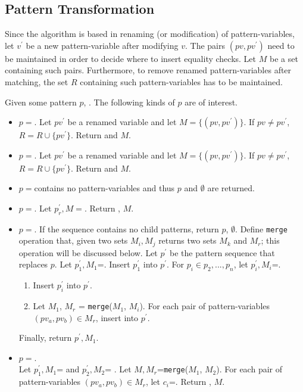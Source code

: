 \subsection{Pattern Transformation}
Since the algorithm is based in renaming (or modification) of pattern-variables, let $v^{\prime}$ be a new pattern-variable after modifying $v$. The pairs $(pv, pv^{\prime})$ need to be maintained in order to decide where to insert equality checks. Let $M$ be a set containing such pairs. Furthermore, to remove renamed pattern-variables after matching, the set $R$ containing such pattern-variables has to be maintained.

Given some pattern $p$, . The following kinds of $p$ are of interest.
\begin{itemize}
\item $p=$\space \BuiltInPattern. Let $pv^{\prime}$ be a renamed variable and let $M=\{(pv, pv^{\prime})\}$. If $pv \neq pv^{\prime}$, $R=R \cup \{pv^{\prime}\}$. Return \BuiltInPattern[$tag$][$pv^{\prime}$][false] and $M$.
\item $p=$\space \NonTerminal. Let $pv^{\prime}$ be a renamed variable and let $M=\{(pv, pv^{\prime})\}$. If $pv \neq pv^{\prime}$, $R=R \cup \{pv^{\prime}\}$. Return \NonTerminal[$nt$][$pv^{\prime}$][false] and $M$.
\item $p=$\space \LiteralPattern \space contains no pattern-variables and thus $p$ and $\emptyset$ are returned.
\item $p=$\space \PatternRepeat. Let $p_r^{\prime}, M =$. Return \PatternRepeat[$p_r^{\prime}$], $M$.
\item
$p=$\space \PatternSequence. If the sequence contains no child patterns, return $p$, $\emptyset$. Define \texttt{merge} operation that, given two sets $M_i, M_j$ returns two sets $M_k$ and $M_r$; this operation will be discussed below.
Let $p^{\prime}$ be the pattern sequence that replaces $p$.
Let $p_1^{\prime}, M_1$=. Insert $p_1^{\prime}$ into $p^{\prime}$. For $p_i \in p_2, ..., p_n$, let $p_i^{\prime}, M_i$=.
	\begin{enumerate}
	\item
	Insert $p_i^{\prime}$ into $p^{\prime}$.
	\item
	Let $M_1$, $M_r$ = \texttt{merge}($M_1$, $M_i$). For each pair of pattern-variables $(pv_a, pv_b) \in M_r$, insert \PatternCheckConstraint[$pv_a$][$pv_b$][false] into $p^{\prime}$.
	\end{enumerate}
Finally, return $p^{\prime}, M_1$.

\item
$p=$\space \PatternInHole.\\ Let $p_1^{\prime}, M_1$=  and $p_2^{\prime}, M_2$= . Let $M, M_r$=\texttt{merge}($M_1$, $M_2$). For each pair of pattern-variables $(pv_a, pv_b) \in M_r$, let $c_i$=\PatternCheckConstraint[$pv_a$][$pv_b$][false]. Return \PatternInHole[$p_1^{\prime}$][$p_2^{\prime}$][$c_1$][$c_n$][false], $M$.
\end{itemize}

